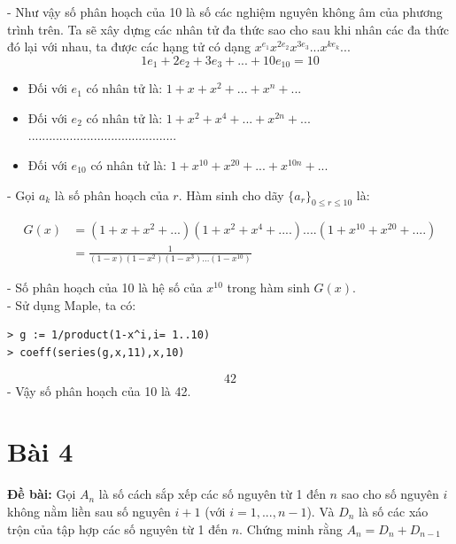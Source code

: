 \documentclass[12pt]{article}
\begin{document}
\begin{sloppypar}
- Như vậy số phân hoạch của 10 là số các nghiệm nguyên không âm của phương trình trên. Ta sẽ xây dựng các nhân tử đa thức sao cho sau khi nhân các đa thức đó lại với nhau, ta được các hạng tử có dạng \(x^{e_{1}}x^{2e_{2}}x^{3e_{3}}...x^{ke_{k}}...\)
\begin{equation*}
    1e_{1} + 2e_{2} + 3e_{3} +...+ 10e_{10} = 10
\end{equation*}

\begin{itemize}
    \item Đối với \(e_{1}\) có nhân tử là: \(1 + x + x^{2} + ... + x^{n} + ...\)
    \item Đối với \(e_{2}\) có nhân tử là: \(1 + x^{2} + x^{4} + ... + x^{2n} + ...\)
    \\ ...........................................
    \item Đối với \(e_{10}\) có nhân tử là: \(1 + x^{10} + x^{20} + ... + x^{10n} + ...\)
\end{itemize}
- Gọi \(a_{k}\) là số phân hoạch của \(r\). Hàm sinh cho dãy \(\{a_{r}\}_{0 \leq r \leq 10}\) là:

\begin{align*}
    G(x) & = (1 + x + x^{2} + ...)(1 + x^{2} + x^{4} + ....)....(1+x^{10}+x^{20}+....) \\
         & = \frac{1}{(1-x)(1-x^{2})(1-x^{3})...(1-x^{10})}  
\end{align*}

- Số phân hoạch của 10 là hệ số của \(x^{10}\) trong hàm sinh \(G(x)\). \\
- Sử dụng Maple, ta có:
\begin{verbatim}
> g := 1/product(1-x^i,i= 1..10)
> coeff(series(g,x,11),x,10)
\end{verbatim}
\begin{equation*}
    42
\end{equation*}
- Vậy số phân hoạch của 10 là 42.

\section{Bài 4}
\begin{tcolorbox}
    \textbf{Đề bài:}  Gọi \(A_{n}\) là số cách sắp xếp các số nguyên từ 1 đến \(n\) sao cho số nguyên \(i\) không nằm liền sau số nguyên \(i+1\) 
    (với \(i=1,...,n-1\)). Và \(D_{n}\) là số các xáo trộn của tập hợp các số nguyên từ 1 đến \(n\). Chứng minh rằng \(A_{n}= D_{n} + D_{n-1}\)
\end{tcolorbox}


\end{sloppypar}
\end{document}
